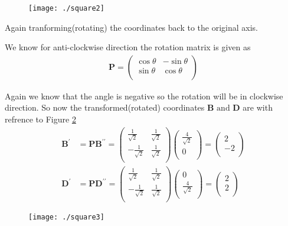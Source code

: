 \documentclass[12pt]{article}
\newcommand{\myvec}[1]{\ensuremath{\begin{pmatrix}#1\end{pmatrix}}}
\let\vec\mathbf
\begin{document}
\begin{figure}[!h]
	\begin{center} 
	    \texttt{[image: ./square2]}
	\end{center}
\caption{}
\label{fig:Fig3}
\end{figure}

\newpage
Again tranforming(rotating) the coordinates back to the original axis.

We know for anti-clockwise direction the rotation matrix is given as
\begin{align}
\vec{P} =
\myvec{
\cos\theta & -\sin\theta \\
\sin\theta & \cos\theta \\
}
\end{align}

Again we know that the angle is negative so the rotation will be in clockwise direction. So now the transformed(rotated) coordinates $\vec{B} \text{ and } \vec{D}$ are with refrence to Figure \ref{fig:Fig4}
\begin{align}
\vec{B^{\prime}} &= \vec{P}\vec{B^{\prime \prime}} = \myvec{
\frac{1}{\sqrt{2}} & \frac{1}{\sqrt{2}} \\
-\frac{1}{\sqrt{2}} & \frac{1}{\sqrt{2}}\\
}
\myvec{
 \frac{4}{\sqrt{2}}\\
 0\\
} = 
\myvec{
2 \\
-2\\
}\\
\vec{D^{\prime}} &= \vec{P}\vec{D^{\prime \prime}} = \myvec{
\frac{1}{\sqrt{2}} & \frac{1}{\sqrt{2}} \\
-\frac{1}{\sqrt{2}} & \frac{1}{\sqrt{2}}\\
}
\myvec{
 0\\
 \frac{4}{\sqrt{2}}\\
} = 
\myvec{
2 \\
2 \\
}
\end{align}

\begin{figure}[!h]
	\begin{center} 
	    \texttt{[image: ./square3]}
	\end{center}
\caption{}
\label{fig:Fig4}
\end{figure}
\end{document}
